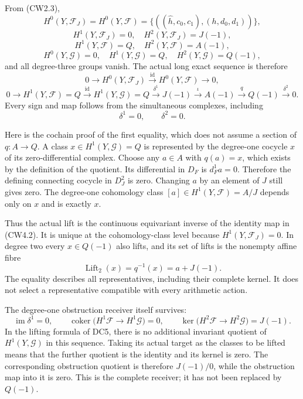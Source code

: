 From (CW2.3), \[
H^0(Y,\mathscr F_J)=H^0(Y,\mathscr F)
=\{((\widehat h,c_0,c_1),(h,d_0,d_1))\},
\] \[
H^1(Y,\mathscr F_J)=0,\quad H^2(Y,\mathscr F_J)=J(-1),
\] \[
H^1(Y,\mathscr F)=Q,\quad H^2(Y,\mathscr F)=A(-1),
\] \[
H^0(Y,\mathscr G)=0,\quad H^1(Y,\mathscr G)=Q,\quad
H^2(Y,\mathscr G)=Q(-1),
\tag{CW4.1}
\] and all degree-three groups vanish. The actual long exact sequence is
therefore \[
0\to H^0(Y,\mathscr F_J)
\xrightarrow{\mathrm{id}}H^0(Y,\mathscr F)\to0,
\] \[
0\to H^1(Y,\mathscr F)=Q
\xrightarrow{\mathrm{id}}H^1(Y,\mathscr G)=Q
\xrightarrow{\delta^1}J(-1)
\xrightarrow{\iota}A(-1)
\xrightarrow{q}Q(-1)\xrightarrow{\delta^2}0.
\tag{CW4.2}
\] Every sign and map follows from the simultaneous complexes, including
\[
\boxed{\delta^1=0,\qquad \delta^2=0.}
\tag{CW4.3}
\]

Here is the cochain proof of the first equality, which does not assume a
section of \(q:A\to Q\). A class \(x\in H^1(Y,\mathscr G)=Q\) is
represented by the degree-one cocycle \(x\) of its zero-differential
complex. Choose any \(a\in A\) with \(q(a)=x\), which exists by the
definition of the quotient. Its differential in \(D_F\) is \(d_F^1a=0\).
Therefore the defining connecting cocycle in \(D_J^2\) is zero. Changing
\(a\) by an element of \(J\) still gives zero. The degree-one cohomology
class \([a]\in H^1(Y,\mathscr F)=A/J\) depends only on \(x\) and is
exactly \(x\).

Thus the actual lift is the continuous equivariant inverse of the
identity map in (CW4.2). It is unique at the cohomology-class level
because \(H^1(Y,\mathscr F_J)=0\). In degree two every \(x\in Q(-1)\)
also lifts, and its set of lifts is the nonempty affine fibre \[
\operatorname{Lift}_2(x)=q^{-1}(x)=a+J(-1).
\tag{CW4.4}
\] The equality describes all representatives, including their complete
kernel. It does not select a representative compatible with every
arithmetic action.

The degree-one obstruction receiver itself survives: \[
\operatorname{im}\delta^1=0,\qquad
\operatorname{coker}\bigl(H^1\mathscr F\to H^1\mathscr G\bigr)=0,
\qquad
\ker\bigl(H^2\mathscr F\to H^2\mathscr G\bigr)=J(-1).
\tag{CW4.5}
\] In the lifting formula of DC5, there is no additional invariant
quotient of \(H^1(Y,\mathscr G)\) in this sequence. Taking its actual
target as the classes to be lifted means that the further quotient is
the identity and its kernel is zero. The corresponding obstruction
quotient is therefore \(J(-1)/0\), while the obstruction map into it is
zero. This is the complete receiver; it has not been replaced by
\(Q(-1)\).

